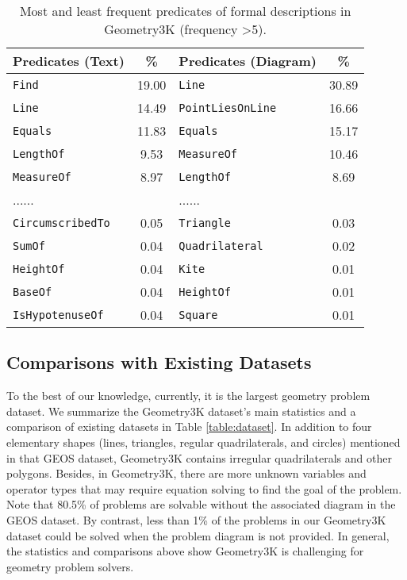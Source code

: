 \documentclass[11pt,a4paper]{article}
\begin{document}
\begin{table}[t!]
\centering 
\setlength{\tabcolsep}{1.5pt}
\footnotesize
\begin{tabular}{lc|lc}
	\hline
	 Predicates (Text) & \% & Predicates (Diagram) & \% \\
	\hline
    \texttt{Find} & 19.00 & \texttt{Line} & 30.89 \\
    \texttt{Line} & 14.49 & \texttt{PointLiesOnLine} & 16.66 \\
    \texttt{Equals} & 11.83 & \texttt{Equals} & 15.17 \\
    \texttt{LengthOf} & 9.53  & \texttt{MeasureOf} & 10.46 \\
    \texttt{MeasureOf} & 8.97 & \texttt{LengthOf} & 8.69  \\
    ...... &  & ...... & \\
    \texttt{CircumscribedTo} & 0.05 & \texttt{Triangle} & 0.03 \\
    \texttt{SumOf} & 0.04 & \texttt{Quadrilateral} & 0.02 \\
    \texttt{HeightOf} & 0.04 & \texttt{Kite} & 0.01 \\
    \texttt{BaseOf} & 0.04 & \texttt{HeightOf} & 0.01 \\
    \texttt{IsHypotenuseOf} & 0.04 & \texttt{Square} & 0.01 \\
	\hline
\end{tabular}
\caption{Most and least frequent predicates of formal descriptions in Geometry3K (frequency \textgreater 5).}
\label{table:literal}
\end{table}

\subsection{Comparisons with Existing Datasets}


To the best of our knowledge, currently, it is the largest geometry problem dataset. We summarize the Geometry3K dataset's main statistics and a comparison of existing datasets in Table \ref{table:dataset}. In addition to four elementary shapes (lines, triangles, regular quadrilaterals, and circles) mentioned in that GEOS dataset, Geometry3K contains irregular quadrilaterals and other polygons. Besides, in Geometry3K, there are more unknown variables and operator types that may require equation solving to find the goal of the problem. Note that 80.5\% of problems are solvable without the associated diagram in the GEOS dataset. By contrast, less than 1\% of the problems in our Geometry3K dataset could be solved when the problem diagram is not provided. In general, the statistics and comparisons above show  Geometry3K is challenging for geometry problem solvers.
\end{document}
